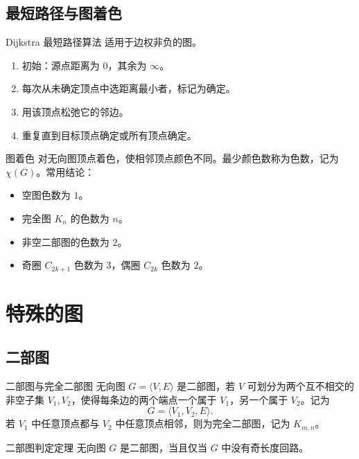 \documentclass[UTF8,zihao=-4]{ctexart}
\begin{document}
\subsection{最短路径与图着色}

\begin{methodbox}{Dijkstra 最短路径算法}
适用于边权非负的图。
\begin{enumerate}
  \item 初始：源点距离为 $0$，其余为 $\infty$。
  \item 每次从未确定顶点中选距离最小者，标记为确定。
  \item 用该顶点松弛它的邻边。
  \item 重复直到目标顶点确定或所有顶点确定。
\end{enumerate}
\end{methodbox}

\begin{corebox}{图着色}
对无向图顶点着色，使相邻顶点颜色不同。最少颜色数称为色数，记为 $\chi(G)$。常用结论：
\begin{itemize}
  \item 空图色数为 $1$。
  \item 完全图 $K_n$ 的色数为 $n$。
  \item 非空二部图的色数为 $2$。
  \item 奇圈 $C_{2k+1}$ 色数为 $3$，偶圈 $C_{2k}$ 色数为 $2$。
\end{itemize}
\end{corebox}

\section{特殊的图}

\subsection{二部图}

\begin{corebox}{二部图与完全二部图}
无向图 $G=\langle V,E\rangle$ 是二部图，若 $V$ 可划分为两个互不相交的非空子集 $V_1,V_2$，使得每条边的两个端点一个属于 $V_1$，另一个属于 $V_2$。记为
\[
G=\langle V_1,V_2,E\rangle.
\]
若 $V_1$ 中任意顶点都与 $V_2$ 中任意顶点相邻，则为完全二部图，记为 $K_{m,n}$。
\end{corebox}

\begin{corebox}{二部图判定定理}
无向图 $G$ 是二部图，当且仅当 $G$ 中没有奇长度回路。
\end{corebox}
\end{document}
